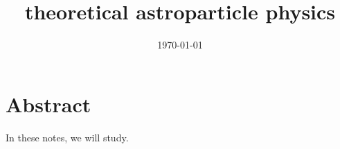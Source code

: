 \documentclass[a4paper, 12pt]{memoir}
\title{theoretical astroparticle physics}
\date{\today}
\begin{document}
\frontmatter



\tableofcontents

\mainmatter



\chapter*{Abstract}

    In these notes, we will study.
    


\backmatter


\clearpage
{}
\printbibliography
\end{document}
